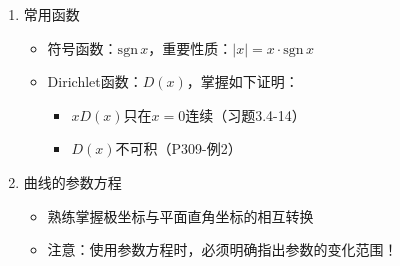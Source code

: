 \begin{enumerate}
    \item 常用函数
    \begin{itemize}
      \item 符号函数：$\mathrm{sgn}\,x$，重要性质：$|x|=x\cdot\mathrm{sgn}\,x$
      \item Dirichlet函数：$D(x)$，掌握如下证明：
      \begin{itemize}
	    \item $xD(x)$只在$x=0$连续（习题3.4-14）
	    \item $D(x)$不可积（P309-例2）
	  \end{itemize}
    \end{itemize}
    \item 曲线的参数方程
    \begin{itemize}
      \item 熟练掌握极坐标与平面直角坐标的相互转换
      \item 注意：使用参数方程时，必须明确指出参数的变化范围！
    \end{itemize}
\end{enumerate}

